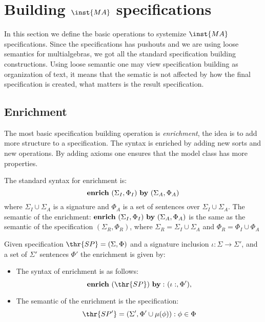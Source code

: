 

\section{Building $\inst{MA}$ specifications}
\label{se:specbuild}
In this section we define the basic operations to systemize $\inst{MA}$ specifications. Since the specifications has pushouts and we are using loose semantics for multialgebras, we got all the standard specification building constructions. Using loose semantic one may view specification building as organization of text, it means that the sematic is not affected by how the final specification is created, what matters is the result specification.


\subsection{Enrichment}
The most basic specification building operation is {\em enrichment}, the idea is to add more structure to a specification. The syntax is enriched by adding new sorts and new operations. By adding axioms one ensures that the model class has more properties.

The standard syntax for enrichment is:
	\[ {\bf enrich \ } (\Sigma_I, \Phi_I)\ {\bf by \ } (\Sigma_A, \Phi_A) \]
where $\Sigma_I \cup \Sigma_A$ is a signature and $\Phi_A$ is a set of sentences over $\Sigma_I \cup \Sigma_A$.
 The semantic of the enrichment: ${\bf enrich \ } (\Sigma_I, \Phi_I) {\bf \ by \ } (\Sigma_A, \Phi_A)$ is the same as the semantic of the specification $(\Sigma_R, \Phi_R)$, where $\Sigma_R = \Sigma_I \cup \Sigma_A$ and $\Phi_R = \Phi_I \cup \Phi_A$

\begin{definition}
Given specification $\thr{SP}= (\Sigma,\Phi)$ and a signature inclusion $\iota: \Sigma \to \Sigma'$, and a set of $\Sigma'$ sentences $\Phi'$ the enrichment is given by:
	\begin{itemize}
	\item The syntax of enrichment is as follows: \\
		\[ {\bf enrich \ } (\thr{SP}) {\bf \ by: \ } (\iota:, \Phi'), \]
	\item The semantic of the enrichment is the specification: \\
		\[ \thr{SP'}= (\Sigma', \Phi' \cup \mu(\phi)) : \phi \in \Phi \]
	\end{itemize}
\end{definition}		

